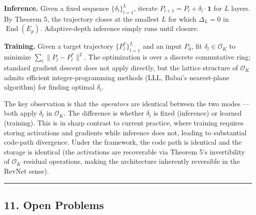 \documentclass[
  11pt,
]{article}
\begin{document}
\textbf{Inference.} Given a fixed sequence \(\{\delta_l\}_{l=1}^L\),
iterate \(P_{l+1} = P_l + \delta_l \cdot \mathbf{1}\) for \(L\) layers.
By Theorem 5, the trajectory closes at the smallest \(L\) for which
\(\Delta_L = 0\) in \(\operatorname{End}(E_p)\). Adaptive-depth
inference simply runs until closure.

\textbf{Training.} Given a target trajectory \(\{P_l^*\}_{l=1}^L\) and
an input \(P_0\), fit \(\delta_l \in \mathcal{O}_K\) to minimize
\(\sum_l \|P_l - P_l^*\|^2\). The optimization is over a discrete
commutative ring; standard gradient descent does not apply directly, but
the lattice structure of \(\mathcal{O}_K\) admits efficient
integer-programming methods (LLL, Babai's nearest-plane algorithm) for
finding optimal \(\delta_l\).

The key observation is that the \emph{operators} are identical between
the two modes --- both apply \(\delta_l\) in \(\mathcal{O}_K\). The
difference is whether \(\delta_l\) is fixed (inference) or learned
(training). This is in sharp contrast to current practice, where
training requires storing activations and gradients while inference does
not, leading to substantial code-path divergence. Under the framework,
the code path is identical and the storage is identical (the activations
are recoverable via Theorem 5's invertibility of \(\mathcal{O}_K\)
residual operations, making the architecture inherently reversible in
the RevNet sense).

\begin{center}\rule{0.5\linewidth}{0.5pt}\end{center}

\hypertarget{open-problems}{%
\subsection{11. Open Problems}\label{open-problems}}
\end{document}

